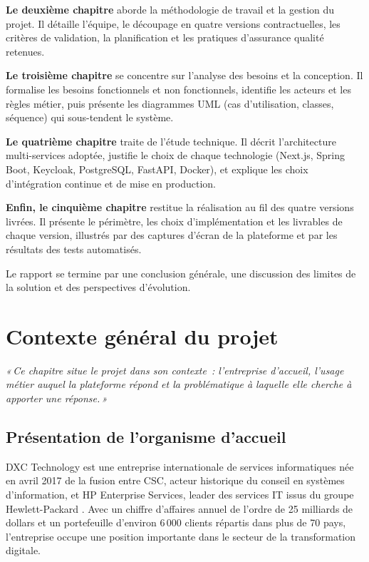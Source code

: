 \documentclass[12pt,a4paper]{report}
\newcommand{\chapterintro}[1]{
    \vspace*{4cm}
    \begin{center}
        \begin{minipage}{0.78\textwidth}
            \centering
            \itshape «\,#1\,»
        \end{minipage}
    \end{center}
    \clearpage
}
\begin{document}
{\color{dxcblue}\textbf{Le deuxième chapitre}} aborde la méthodologie de travail et la gestion du projet. Il détaille l'équipe, le découpage en quatre versions contractuelles, les critères de validation, la planification et les pratiques d'assurance qualité retenues.

{\color{dxcblue}\textbf{Le troisième chapitre}} se concentre sur l'analyse des besoins et la conception. Il formalise les besoins fonctionnels et non fonctionnels, identifie les acteurs et les règles métier, puis présente les diagrammes UML (cas d'utilisation, classes, séquence) qui sous-tendent le système.

{\color{dxcblue}\textbf{Le quatrième chapitre}} traite de l'étude technique. Il décrit l'architecture multi-services adoptée, justifie le choix de chaque technologie (Next.js, Spring Boot, Keycloak, PostgreSQL, FastAPI, Docker), et explique les choix d'intégration continue et de mise en production.

{\color{dxcblue}\textbf{Enfin, le cinquième chapitre}} restitue la réalisation au fil des quatre versions livrées. Il présente le périmètre, les choix d'implémentation et les livrables de chaque version, illustrés par des captures d'écran de la plateforme et par les résultats des tests automatisés.

Le rapport se termine par une conclusion générale, une discussion des limites de la solution et des perspectives d'évolution.

\chapter{Contexte général du projet}
\chapterintro{Ce chapitre situe le projet dans son contexte~: l'entreprise d'accueil, l'usage métier auquel la plateforme répond et la problématique à laquelle elle cherche à apporter une réponse.}

\section{Présentation de l'organisme d'accueil}
DXC Technology est une entreprise internationale de services informatiques née en avril 2017 de la fusion entre CSC, acteur historique du conseil en systèmes d'information, et HP Enterprise Services, leader des services IT issus du groupe Hewlett-Packard \cite{dxcorg}. Avec un chiffre d'affaires annuel de l'ordre de 25 milliards de dollars et un portefeuille d'environ 6\,000 clients répartis dans plus de 70 pays, l'entreprise occupe une position importante dans le secteur de la transformation digitale.
\end{document}
